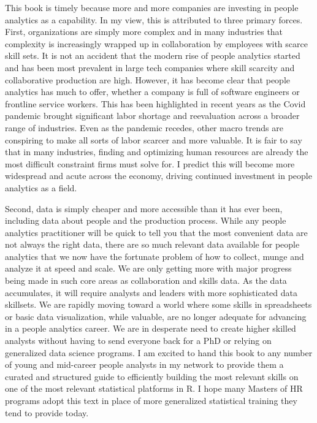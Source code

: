 \documentclass[
]{book}
\begin{document}
This book is timely because more and more companies are investing in people analytics as a capability. In my view, this is attributed to three primary forces. First, organizations are simply more complex and in many industries that complexity is increasingly wrapped up in collaboration by employees with scarce skill sets. It is not an accident that the modern rise of people analytics started and has been most prevalent in large tech companies where skill scarcity and collaborative production are high. However, it has become clear that people analytics has much to offer, whether a company is full of software engineers or frontline service workers. This has been highlighted in recent years as the Covid pandemic brought significant labor shortage and reevaluation across a broader range of industries. Even as the pandemic recedes, other macro trends are conspiring to make all sorts of labor scarcer and more valuable. It is fair to say that in many industries, finding and optimizing human resources are already the most difficult constraint firms must solve for. I predict this will become more widespread and acute across the economy, driving continued investment in people analytics as a field.

Second, data is simply cheaper and more accessible than it has ever been, including data about people and the production process. While any people analytics practitioner will be quick to tell you that the most convenient data are not always the right data, there are so much relevant data available for people analytics that we now have the fortunate problem of how to collect, munge and analyze it at speed and scale. We are only getting more with major progress being made in such core areas as collaboration and skills data. As the data accumulates, it will require analysts and leaders with more sophisticated data skillsets. We are rapidly moving toward a world where some skills in spreadsheets or basic data visualization, while valuable, are no longer adequate for advancing in a people analytics career. We are in desperate need to create higher skilled analysts without having to send everyone back for a PhD or relying on generalized data science programs. I am excited to hand this book to any number of young and mid-career people analysts in my network to provide them a curated and structured guide to efficiently building the most relevant skills on one of the most relevant statistical platforms in R. I hope many Masters of HR programs adopt this text in place of more generalized statistical training they tend to provide today.
\end{document}
